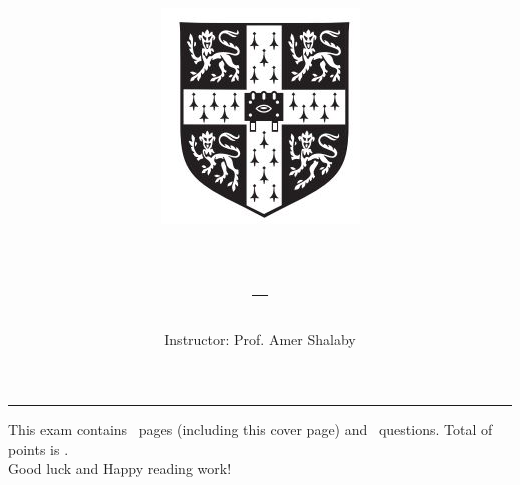 \title{\includegraphics[scale=0.3]{logo.JPG}\Large \textbf{\university\\ \faculty\\
\bigskip
\class -- \examnum \\ \content}}
\author{Instructor: Prof. Amer Shalaby}
\date{\examdate}
\maketitle
\begin{flushleft}
\medskip
{}
\end{flushleft}
\noindent \rule{\textwidth}{1pt}

\noindent This exam contains \numpages\ pages (including this cover page) and \numquestions\ questions. Total of points is \numpoints.\\
Good luck and Happy reading work!

\clearpage